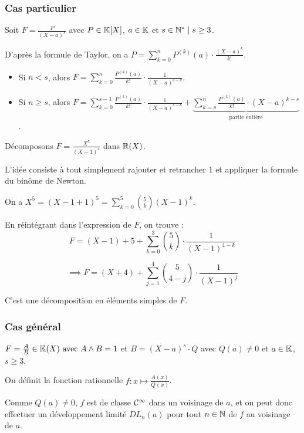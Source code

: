 \documentclass[12pt, a4paper]{report}
\begin{document}
\subsubsection{Cas particulier}

Soit $F = \frac{P}{(X-a)^s}$ avec $P \in \mathbb{K}[X]$, $a \in \mathbb{K}$ et $s \in \mathbb{N}^* \mid s \ge 3$.

D'après la formule de Taylor, on a $P = \sum_{k=0}^{n}P^{(k)}(a) \cdot \frac{(X-a)^k}{k!}$.

\begin{itemize}
    \item Si $n < s$, alors $F = \sum_{k=0}^{n} \frac{P^{(k)}(a)}{k!} \cdot \frac{1}{(X-a)^{s-k}}$.
    \item Si $n \ge s$, alors $F = \sum_{k=0}^{s-1} \frac{P^{(k)}(a)}{k!} \cdot \frac{1}{(X-a)^{s-k}} + \underbrace{\sum_{k=s}^{n} \frac{P^{(k)}(a)}{k!} \cdot (X-a)^{k-s}}_{\text{partie entière}}$. 
\end{itemize}

\begin{example}
    Décomposons $F = \frac{X^5}{(X-1)^4}$ dans $\mathbb{R}(X)$.

    L'idée consiste à tout simplement rajouter et retrancher 1 et appliquer la formule du binôme de Newton.

    On a $X^5 = (X-1+1)^5 = \sum_{k=0}^5 \binom{5}{k} (X-1)^k$.

    En réintégrant dans l'expression de $F$, on trouve :
    $$F = (X-1)+5+\sum_{k=0}^3 \binom{5}{k} \cdot \frac{1}{(X-1)^{4-k}}$$

    $$\implies F = (X+4)+\sum_{j=1}^{4} \binom{5}{4-j} \cdot \frac{1}{(X-1)^j}$$

    C'est une décomposition en éléments simples de $F$.
\end{example}

\subsubsection{Cas général}

$F = \frac AB \in \mathbb{K}(X) \text{ avec } A \wedge B = 1$ et $B = (X-a)^s \cdot Q$ avec $Q(a) \neq 0$ et $a \in \mathbb{K}$, $s \ge 3$.

On définit la fonction rationnelle $f: x\mapsto \frac{A(x)}{Q(x)}$.

Comme $Q(a) \neq 0$, $f$ est de classe $\mathcal{C}^{\infty}$ dans un voisinage de $a$, et on peut donc effectuer un développement limité $DL_n(a)$ pour tout $n \in \mathbb{N}$ de $f$ au voisinage de $a$.
\end{document}
